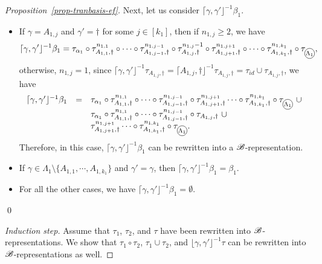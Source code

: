 \begin{proof}[Proposition~\ref{prop-tranbasis-ef}]
	Next, let us consider $\lceil \gamma, \gamma' \rfloor^{-1} \beta_1$. 
	\begin{itemize}
		\item If $\gamma = A_{1, j}$ and $\gamma' = \dag$ for some $j \in [k_1]$, then if $n_{1,j} \ge 2$, we have
		$$\lceil \gamma, \gamma' \rfloor^{-1} \beta_1 = \tau_{ \alpha_1} \circ \tau^{n_{1,1}}_{A_{1,1}, \dag} \circ \cdots \circ \tau^{n_{1,j-1}}_{A_{1,j-1}, \dag}  \circ \tau^{n_{1,j}-1}_{A_{1,j}, \dag}  \circ  \tau^{n_{1, j+1}}_{A_{1, j+1}, \dag}  \circ \cdots \circ \tau^{n_{1, k_1}}_{A_{1, k_1}, \dag} \circ \tau_{\mathcircled{\Lambda_1}},$$ 
		otherwise, $n_{1,j} = 1$, since $\lceil \gamma, \gamma' \rfloor^{-1} \tau_{A_{1,j}, \dag} = \lceil A_{1, j}, \dag \rfloor^{-1} \tau_{A_{1,j}, \dag} = \tau_{id} \cup \tau_{A_{1,j}, \dag}$,  we have
		$$
		\begin{array}{l c l}
		\lceil \gamma, \gamma' \rfloor^{-1} \beta_1 & = & \tau_{\alpha_1} \circ \tau^{n_{1,1}}_{A_{1,1}, \dag} \circ \cdots \circ \tau^{n_{1,j-1}}_{A_{1,j-1}, \dag}  \circ \tau^{n_{1,j+1}}_{A_{1,j+1}, \dag} \cdots \circ \tau^{n_{1, k_1}}_{A_{1, k_1}, \dag} \circ \tau_{\mathcircled{\Lambda_1}}\ \cup  \\ 
		& & \tau_{\alpha_1} \circ \tau^{n_{1,1}}_{A_{1,1}, \dag} \circ \cdots \circ \tau^{n_{1,j-1}}_{A_{1,j-1}, \dag}  \circ \tau_{A_{1,j}, \dag}\ \cup\\
		& & \tau^{n_{1,j+1}}_{A_{1,j+1}, \dag} \cdots \circ \tau^{n_{1, k_1}}_{A_{1, k_1}, \dag} \circ \tau_{\mathcircled{\Lambda_1}}.
		\end{array}
		$$
		Therefore, in this case, $\lceil \gamma, \gamma' \rfloor^{-1} \beta_1$ can be rewritten into a ${\mathscr{B} }$-representation.
		\item If $\gamma \in \Lambda_1 \setminus \{A_{1,1}, \cdots, A_{1, k_1}\}$ and $\gamma' = \gamma$, then $\lceil \gamma, \gamma' \rfloor^{-1} \beta_1 = \beta_1$. 
		\item For all the other cases, we have $\lceil \gamma, \gamma' \rfloor^{-1} \beta_1 = \emptyset$.
	\end{itemize}
	\qed
	
	\smallskip
	\noindent\emph{Induction step.} Assume that $\tau_1$, $\tau_2$, and $\tau$ have been rewritten into ${\mathscr{B} }$-representations. We show that $\tau_1 \circ \tau_2$, $\tau_1 \cup \tau_2$, and $\lfloor \gamma, \gamma' \rfloor^{-1} \tau$ can be rewritten into ${\mathscr{B} }$-representations as well.
	

\end{proof}
